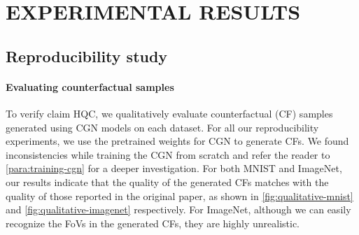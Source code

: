 \section{EXPERIMENTAL RESULTS}
\label{sec:results}

\subsection{Reproducibility study} \label{ssec:reproducibility-results}
\paragraph{Evaluating counterfactual samples} To verify claim HQC, we qualitatively evaluate counterfactual (CF) samples generated using CGN models on each dataset.
For all our reproducibility experiments, we use the pretrained weights for CGN to generate CFs.
We found inconsistencies while training the CGN from scratch and refer the reader 
to \cref{para:training-cgn} for a deeper investigation. 
For both MNIST and ImageNet, our results indicate that the quality of the generated 
CFs matches with the quality of those reported in the original paper,
as shown in \cref{fig:qualitative-mnist} and \cref{fig:qualitative-imagenet} respectively.
For ImageNet, although we can easily recognize the FoVs in the generated CFs,
they are highly unrealistic.

